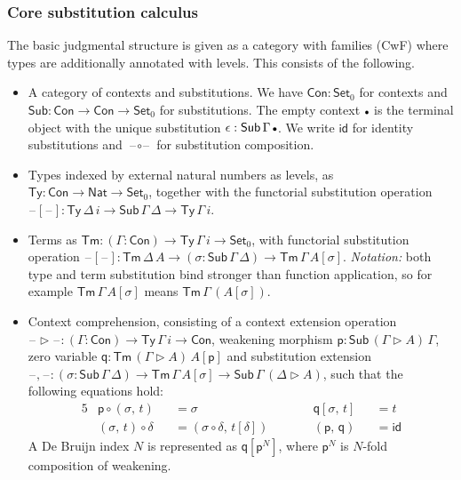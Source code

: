 \documentclass[acmsmall,screen,review,anonymous]{acmart}
\newcommand{\msf}[1]{{\mathsf{#1}}}
\newcommand{\p}{\mathsf{p}}
\newcommand{\q}{\mathsf{q}}
\newcommand{\Set}{\msf{Set}}
\newcommand{\Nat}{\msf{Nat}}
\newcommand{\blank}{{\mathord{\hspace{1pt}\text{--}\hspace{1pt}}}}
\newcommand{\emptycon}{\scaleobj{.75}\bullet}
\newcommand{\id}{\msf{id}}
\newcommand{\Con}{\msf{Con}}
\newcommand{\Sub}{\msf{Sub}}
\newcommand{\Ty}{\msf{Ty}}
\newcommand{\Tm}{\msf{Tm}}
\newcommand{\ext}{\triangleright}
\begin{document}
\subsubsection{Core substitution calculus} The basic judgmental structure is given
as a category with families (CwF) \cite{Dybjer96internaltype,cwfs} where types are additionally
annotated with levels. This consists of the following.
\begin{itemize}
\item A category of contexts and substitutions. We have $\Con : \Set_0$ for contexts and $\Sub : \Con \to \Con \to \Set_0$
  for substitutions. The empty context $\emptycon$ is the terminal object with the unique substitution $\epsilon : \Sub\,\Gamma\,\emptycon$.
  We write $\id$ for identity substitutions and $\blank\!\circ\!\blank$ for substitution composition.
\item Types indexed by external natural numbers as levels, as $\Ty : \Con \to \Nat \to \Set_0$,
  together with the functorial substitution operation $\blank[\blank] : \Ty\,\Delta\,i \to
  \Sub\,\Gamma\,\Delta \to \Ty\,\Gamma\,i$.
\item Terms as $\Tm : (\Gamma : \Con) \to \Ty\,\Gamma\,i \to \Set_0$, with functorial substitution operation
  $\blank[\blank] : \Tm\,\Delta\,A \to (\sigma : \Sub\,\Gamma\,\Delta) \to \Tm\,\Gamma\,A[\sigma]$.
  \emph{Notation:} both type and term substitution bind stronger than function application, so
  for example $\Tm\,\Gamma\,A[\sigma]$ means $\Tm\,\Gamma\,(A[\sigma])$.
\item Context comprehension, consisting of a context extension operation $\blank\!\ext\!\blank : (\Gamma : \Con) \to \Ty\,\Gamma\,i \to \Con$,
  weakening morphism $\p : \Sub\,(\Gamma\ext A)\,\Gamma$, zero variable $\q : \Tm\,(\Gamma\ext A)\,A[\p]$ and substitution extension $\blank,\!\blank : (\sigma : \Sub\,\Gamma\,\Delta) \to \Tm\,\Gamma\,A[\sigma] \to \Sub\,\Gamma\,(\Delta\ext A)$, such that the following equations hold:
  \begin{alignat*}{5}
    &\p \circ (\sigma,\,t)     &&= \sigma                             &&\q[\sigma,\,t] &&= t\\
    &(\sigma,\,t) \circ \delta &&= (\sigma \circ \delta,\,t[\delta])\hspace{2em} && (\p,\,\q) &&= \id
  \end{alignat*}
  A De Bruijn index $N$ is represented as $\q[\p^N]$, where $\p^N$ is $N$-fold composition
  of weakening.
\end{itemize}
\end{document}
